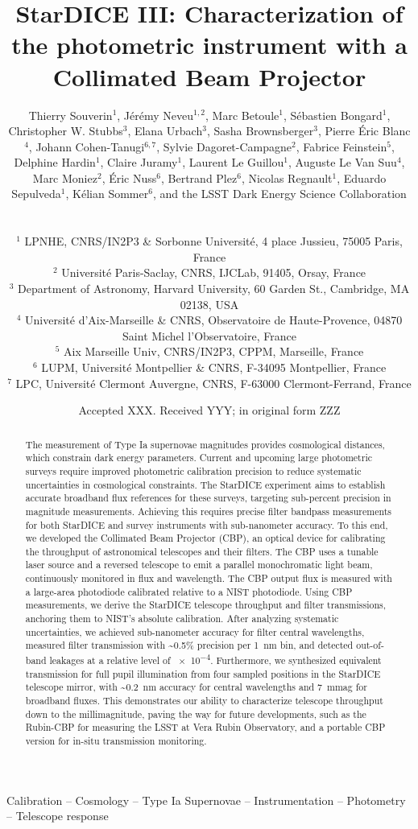\documentclass[fleqn,usenatbib]{rasti}
\title{StarDICE III: Characterization of the photometric instrument with a Collimated Beam Projector}
\author[T.~Souverin et al.]
{\parbox{\textwidth}{
Thierry Souverin$^{1}$,
Jérémy Neveu$^{1,2}$,
Marc Betoule$^{1}$,
Sébastien Bongard$^{1}$,
Christopher W. Stubbs$^{3}$,
Elana Urbach$^{3}$,
Sasha Brownsberger$^{3}$,
Pierre Éric Blanc$^{4}$,
Johann Cohen-Tanugi$^{6,7}$,
Sylvie Dagoret-Campagne$^{2}$,
Fabrice Feinstein$^{5}$,
Delphine Hardin$^{1}$,
Claire Juramy$^{1}$,
Laurent Le Guillou$^{1}$,
Auguste Le Van Suu$^{4}$,
Marc Moniez$^{2}$,
Éric Nuss\textsuperscript{\textdagger}$^{6}$,
Bertrand Plez$^{6}$,
Nicolas Regnault$^{1}$,
Eduardo Sepulveda$^{1}$,
Kélian Sommer$^{6}$,
and the LSST Dark Energy Science Collaboration$^{}$}
  \vspace{0.4cm}
  \\
\parbox{\textwidth}{
$^1$ LPNHE, CNRS/IN2P3 \& Sorbonne Université, 4 place Jussieu, 75005 Paris, France\\
$^2$ Universit\'e Paris-Saclay, CNRS, IJCLab, 91405, Orsay, France\\
$^3$ Department of Astronomy, Harvard University, 60 Garden St., Cambridge, MA 02138, USA\\
$^4$ Université d’Aix-Marseille \& CNRS, Observatoire de Haute-Provence, 04870 Saint Michel l’Observatoire, France\\
$^5$ Aix Marseille Univ, CNRS/IN2P3, CPPM, Marseille, France\\
$^6$ LUPM, Université Montpellier \& CNRS, F-34095 Montpellier, France\\
$^7$ LPC, Université Clermont Auvergne, CNRS, F-63000 Clermont-Ferrand, France}
}
\date{Accepted XXX. Received YYY; in original form ZZZ}
\begin{document}
\label{firstpage}
\pagerange{\pageref{firstpage}--\pageref{lastpage}}
\maketitle

\begin{abstract}
The measurement of Type Ia supernovae magnitudes provides cosmological distances, which constrain dark energy parameters. Current and upcoming large photometric surveys require improved photometric calibration precision to reduce systematic uncertainties in cosmological constraints. The StarDICE experiment aims to establish accurate broadband flux references for these surveys, targeting sub-percent precision in magnitude measurements. Achieving this requires precise filter bandpass measurements for both StarDICE and survey instruments with sub-nanometer accuracy. To this end,  we developed the Collimated Beam Projector (CBP), an optical device for calibrating the throughput of astronomical telescopes and their filters. The CBP uses a tunable laser source and a reversed telescope to emit a parallel monochromatic light beam, continuously monitored in flux and wavelength. The CBP output flux is measured with a large-area photodiode calibrated relative to a NIST photodiode. Using CBP measurements, we derive the StarDICE telescope throughput and filter transmissions, anchoring them to NIST’s absolute calibration. After analyzing systematic uncertainties, we achieved sub-nanometer accuracy for filter central wavelengths, measured filter transmission with \textasciitilde 0.5\%  precision per \SI{1}{nm} bin, and detected out-of-band leakages at a relative level of \num{e-4}. Furthermore, we synthesized equivalent transmission for full pupil illumination from four sampled positions in the StarDICE telescope mirror, with \textasciitilde \SI{0.2}{nm} accuracy for central wavelengths and \SI{7}{mmag} for broadband fluxes. This demonstrates our ability to characterize telescope throughput down to the millimagnitude, paving the way for future developments, such as the Rubin-CBP for measuring the LSST at Vera Rubin Observatory, and a portable CBP version for in-situ transmission monitoring.
\end{abstract}

\begin{keywords}
Calibration -- Cosmology -- Type Ia Supernovae -- Instrumentation -- Photometry -- Telescope response
\end{keywords}
\end{document}

